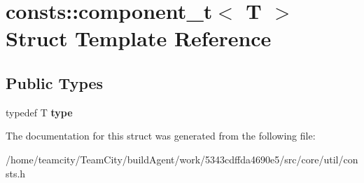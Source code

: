 \hypertarget{structconsts_1_1component__t}{}\section{consts\+:\+:component\+\_\+t$<$ T $>$ Struct Template Reference}
\label{structconsts_1_1component__t}
\subsection*{Public Types}
\begin{DoxyCompactItemize}
\item 
typedef T {\bfseries type}\hypertarget{structconsts_1_1component__t_a3c8d59aa909fe6a8271b795ed8d34f3e}{}\label{structconsts_1_1component__t_a3c8d59aa909fe6a8271b795ed8d34f3e}

\end{DoxyCompactItemize}


The documentation for this struct was generated from the following file\+:\begin{DoxyCompactItemize}
\item 
/home/teamcity/\+Team\+City/build\+Agent/work/5343cdffda4690e5/src/core/util/consts.\+h\end{DoxyCompactItemize}

